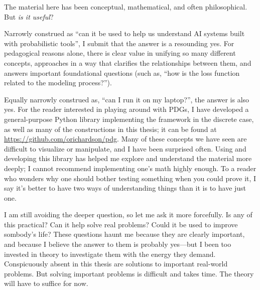 The material here has been conceptual, mathematical, and often philosophical.
But \emph{is it useful}?

Narrowly construed as ``can it be used to help us understand AI systems built with probabilistic tools'', I submit that the answer is a resounding yes. 
For pedagogical reasons alone, there is clear value in unifying so many different concepts, approaches in a way that clarifies the relationships between them, and answers important foundational questions (such as, ``how is the loss function related to the modeling process?'').

Equally narrowly construed as, ``can I run it on my laptop?'', the answer is also yes. 
For the reader interested in playing around with PDGs, I have developed a general-purpose Python library implementing the framework in the discrete case, as well as many of the constructions in this thesis;
it can be found at \url{https://github.com/orichardson/pdg}.
%
Many of these concepts we have seen are difficult to visualize or manipulate, and I have been surprised often.
Using and developing this library has helped me explore and understand the material more deeply; I cannot recommend implementing one's math highly enough. 
To a reader who wonders why one should bother testing something when you could prove it, I say it's better to have two ways of understanding things than it is to have just one. 

%


I am still avoiding the deeper question, so let me ask it more forcefully.
Is any of this practical? Can it help solve real problems? Could it be used to improve sombody's life? 
These questions haunt me because they are clearly important, and because I believe the answer to them is probably yes---but I been too invested in theory to investigate them with the energy they demand.  
Conspicuously absent in this thesis are solutions to important real-world problems. 
But solving important problems is difficult and takes time. 
The theory will have to suffice for now. 



